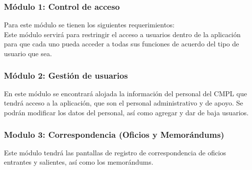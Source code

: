 \subsubsection{Módulo 1: Control de acceso}
Para este módulo se tienen los siguientes requerimientos: \\

Este módulo servirá para restringir el acceso a usuarios dentro de la aplicación para que cada uno pueda acceder a todas sus funciones de acuerdo del tipo de usuario que sea.\\ %

\subsubsection{Módulo 2: Gestión de usuarios}
En este módulo se encontrará alojada la información del personal del CMPL que tendrá acceso a la aplicación, que son el personal administrativo y de apoyo. Se podrán modificar los datos del personal, así como agregar y dar de baja usuarios. \\ %

\subsubsection{Modulo 3: Correspondencia (Oficios y Memorándums)}
Este módulo tendrá las pantallas de registro de correspondencia de oficios entrantes y salientes, así como los memorándums.\\ %

